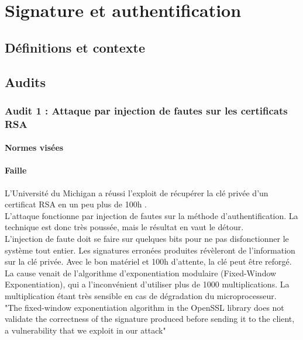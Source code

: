 \chapter{Signature et authentification}
\section{Définitions et contexte}

\section{Audits}
	\subsection{Audit 1 : Attaque par injection de fautes sur les certificats RSA}
		\subsubsection{Normes visées}
	
		
		\subsubsection{Faille}
		
			L'Université du Michigan a réussi l'exploit de récupérer la 
			clé privée d'un certificat RSA en un peu plus de 100h
			\cite{andrea2010RSA} \cite{opensslvuln2010}.\\
			L'attaque fonctionne par injection de fautes \cite{fault2008lawson} 
			sur la méthode d'authentification. 
			La technique est donc très poussée, mais le résultat en vaut 
			le détour.\\
		
			L'injection de faute doit se faire sur quelques bits pour ne pas
			disfonctionner le système tout entier. 
			Les signatures erronées produites révèleront de l'information 
			sur la clé privée. 
			Avec le bon matériel et 100h d'attente, la clé peut être reforgé.\\
		
			La cause venait de l'algorithme d'exponentiation modulaire 
			(Fixed-Window Exponentiation), qui a l'inconvénient d'utiliser 
			plus de 1000 multiplications.
			La multiplication étant très sensible en cas de dégradation du
			microprocesseur.\\
			
			"The fixed-window exponentiation algorithm in the OpenSSL library 
			does not validate the correctness of the signature produced before
			sending it to the client, a vulnerability that we exploit in our
			attack"\\
			
